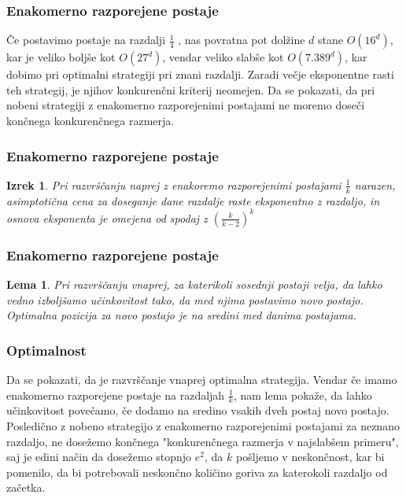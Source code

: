 \documentclass{beamer}
\newtheorem{izrek}{Izrek}
\newtheorem{lema}{Lema}
\begin{document}
 \begin{frame}
    \frametitle{Enakomerno razporejene postaje}
    Če postavimo postaje na razdalji  $\frac{1}{4}$ , nas povratna pot dolžine $d$ stane $O(16^d)$,
    kar je veliko boljše kot $O(27^d)$, vendar veliko slabše kot $O(7.389^d)$, kar dobimo pri optimalni strategiji
    pri znani razdalji. Zaradi večje eksponentne rasti teh strategij, je njihov konkurenčni kriterij neomejen.
    Da se pokazati, da pri nobeni strategiji z enakomerno razporejenimi postajami ne moremo doseči končnega 
    konkurenčnega razmerja.
\end{frame}


 \begin{frame}
    \frametitle{Enakomerno razporejene postaje}
    \begin{izrek}
        Pri razvrščanju naprej z enakoremo razporejenimi postajami $\frac{1}{k}$ narazen, asimptotična
        cena za doseganje dane razdalje raste eksponentno z razdaljo, in osnova eksponenta je omejena od spodaj z
         $(\frac{k}{k-2})^k$
    \end{izrek}
\end{frame}


\begin{frame}
    \frametitle{Enakomerno razporejene postaje}
    \begin{lema}
        Pri razvrščanju vnaprej, za katerikoli sosednji postaji velja, da lahko vedno izboljšamo učinkovitost 
        tako, da med njima postavimo novo postajo. Optimalna pozicija za novo postajo je na sredini med danima 
        postajama.
    \end{lema}
\end{frame}


 \begin{frame}
    \frametitle{Optimalnost}
    Da se pokazati, da je razvrščanje vnaprej optimalna strategija. Vendar če imamo enakomerno razporejene 
    postaje na razdaljah $\frac{1}{k}$, nam lema pokaže, da lahko učinkovitost povečamo, če dodamo na sredino vsakih dveh postaj novo postajo. 
    Posledično z nobeno strategijo z enakomerno razporejenimi postajami za neznano razdaljo, ne dosežemo končnega "konkurenčnega
    razmerja v najslabšem primeru", saj je edini način da dosežemo stopnjo $e^{2}$, da $k$ pošljemo v neskončnost, kar bi 
    pomenilo, da bi potrebovali neskončno količino goriva za katerokoli razdaljo od začetka.
    \end{frame}
\end{document}
